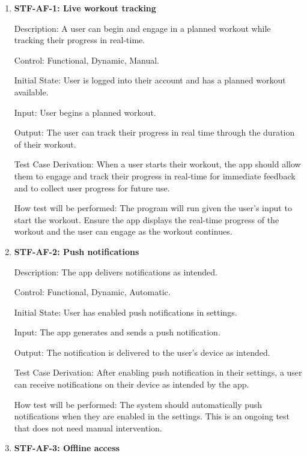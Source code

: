 \documentclass[12pt, titlepage]{article}
\begin{document}
    \begin{enumerate}

        \item{\textbf{STF-AF-1: Live workout tracking}\\}

        Description: A user can begin and engage in a planned workout while tracking their progress in real-time.

        Control: Functional, Dynamic, Manual.

        Initial State: User is logged into their account and has a planned workout available.

        Input: User begins a planned workout.

        Output: The user can track their progress in real time through the duration of their workout.

        Test Case Derivation: When a user starts their workout, the app should allow them to engage and track their progress in real-time for immediate feedback and to collect user progress for future use.

        How test will be performed: The program will run given the user’s input to start the workout. Ensure the app displays the real-time progress of the workout and the user can engage as the workout continues.

        \item{\textbf{STF-AF-2: Push notifications}\\}

        Description: The app delivers notifications as intended.

        Control: Functional, Dynamic, Automatic.

        Initial State: User has enabled push notifications in settings.

        Input: The app generates and sends a push notification.

        Output: The notification is delivered to the user’s device as intended.

        Test Case Derivation: After enabling push notification in their settings, a user can receive notifications on their device as intended by the app.

        How test will be performed: The system should automatically push notifications when they are enabled in the settings. This is an ongoing test that does not need manual intervention.

        \item{\textbf{STF-AF-3: Offline access}\\}


\end{enumerate}
\end{document}
